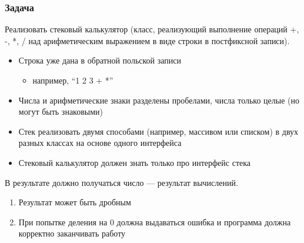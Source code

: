 \documentclass{../../slides-style}
\begin{document}
    \begin{frame}[plain]
        \titlepage
    \end{frame}

    \begin{frame}
        \frametitle{Задача}
        Реализовать стековый калькулятор (класс, реализующий выполнение операций +, -, *, / над арифметическим выражением в виде строки в постфиксной записи).
        \begin{itemize}
            \item Строка уже дана в обратной польской записи
            \begin{itemize}
                \item например, \enquote{1 2 3 + *}
            \end{itemize}
            \item Числа и арифметические знаки разделены пробелами, числа только целые (но могут быть знаковыми)
            \item Стек реализовать двумя способами (например, массивом или списком) в двух разных классах на основе одного интерфейса
            \item Стековый калькулятор должен знать только про интерфейс стека
        \end{itemize} 
        
        В результате должно получаться число --- результат вычислений. 
        \begin{enumerate}
            \item Результат может быть дробным
            \item При попытке деления на 0 должна выдаваться ошибка и программа должна корректно заканчивать работу
        \end{enumerate}
    \end{frame}
\end{document}
